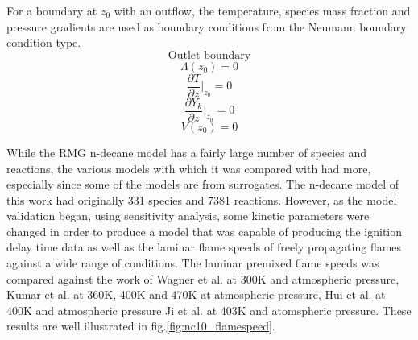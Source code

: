 For a boundary at $z_0$ with an outflow, the temperature, species mass fraction and pressure gradients are used as boundary conditions from the Neumann boundary condition type. 
\[\text{Outlet boundary}\]
\begin{equation}
    \Lambda(z_0) = 0  
    \end{equation}
    \begin{equation}
       \frac{\partial T}{\partial z}|_{z_0}= 0  
    \end{equation}
    \begin{equation}
      \frac{\partial Y_k}{\partial z} |_{z_0} = 0   
    \end{equation}
    \begin{equation}
        V(z_0)=0
    \end{equation}
    


While the RMG n-decane model has a fairly large number of species and reactions, the various models with which it was compared with had more, especially since some of the models are from surrogates. The n-decane model of this work had originally 331 species and 7381 reactions. However, as the model validation began, using sensitivity analysis, some kinetic parameters were changed in order to produce a model that was capable of producing the ignition delay time data as well as the laminar flame speeds of freely propagating flames against a wide range of conditions. The laminar premixed flame speeds was compared against the work of Wagner et al. \cite{Wagner1955FlameVelocity} at 300K and atmospheric pressure, Kumar et al. \cite{KUMAR2007209} at 360K, 400K and 470K at atmospheric pressure, Hui et al. \cite{Hui2013LaminarPressures} at 400K and atmospheric pressure Ji et al. \cite{Ji2010PropagationFlames} at 403K and atomspheric pressure. These results are well illustrated in fig.\ref{fig:nc10_flamespeed}. 


